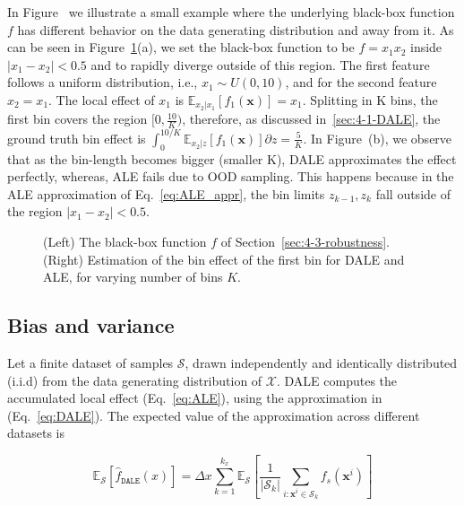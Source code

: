 \documentclass[wcp]{jmlr}
\newcommand{\dale}{\hat{f}_{\mathtt{DALE}}}
\newcommand{\xb}{\mathbf{x}} \newcommand{\R}{\mathbb{R}}
\newcommand{\E}{\mathbb{E}} \newcommand{\Jac}{\mathbf{J}}
\begin{document}
In Figure~ we illustrate a small
example where the underlying black-box function \(f\) has different
behavior on the data generating distribution and away from it. As can
be seen in Figure~\ref{fig:example-different-bins}(a), we set the
black-box function to be \(f = x_1x_2\) inside \(|x_1-x_2| < 0.5\) and
to rapidly diverge outside of this region. The first feature follows a
uniform distribution, i.e., \(x_1 \sim U(0,10)\), and for the second
feature \(x_2=x_1\). The local effect of \(x_1\) is
\(\E_{x_2|x_1} \left [ f_1(\xb) \right ] = x_1 \). Splitting in K bins,
the first bin covers the region \( [0, \frac{10}{K} ) \), therefore,
as discussed in~\ref{sec:4-1-DALE}, the ground truth bin effect is
\(\int_0^{10/K} \E_{x_2|z}\left[f_1(\xb)\right]\partial z =
\frac{5}{K}\). In Figure~(b), we
observe that as the bin-length becomes bigger (smaller K), DALE
approximates the effect perfectly, whereas, ALE fails due to OOD
sampling. This happens because in the ALE approximation of
Eq.~\eqref{eq:ALE_appr}, the bin limits \(z_{k-1}, z_k\) fall outside
of the region \(|x_1-x_2| < 0.5\).

\begin{figure}[h]
  \centering
  \resizebox{.35\columnwidth}{!}{}
  \resizebox{.35\columnwidth}{!}{}
  \caption[Example comparison]{(Left) The black-box function \(f\) of
    Section~\ref{sec:4-3-robustness}. (Right) Estimation of the bin
    effect of the first bin for DALE and ALE, for varying number of
    bins \(K\).}
  \label{fig:example-different-bins}
\end{figure}


\subsection{Bias and variance}
\label{sec:4-4-std}
Let a finite dataset of samples \(\mathcal{S}\), drawn independently
and identically distributed (i.i.d) from the data generating
distribution of \(\mathcal{X}\). DALE computes the accumulated local
effect (Eq.~\eqref{eq:ALE}), using the approximation in
(Eq.~\eqref{eq:DALE}). The expected value of the approximation across
different datasets is

\begin{equation}
  \mathbb{E}_{\mathcal{S}}[\dale(x)] =
  \Delta x\sum_{k=1}^{k_x}\mathbb{E}_{\mathcal{S}}[\frac{1}{|\mathcal{S}_k|}\sum_{i:\xb^i \in
      \mathcal{S}_k} f_s(\xb^i)]
  \label{eq:bias_dale}
\end{equation}
\end{document}
